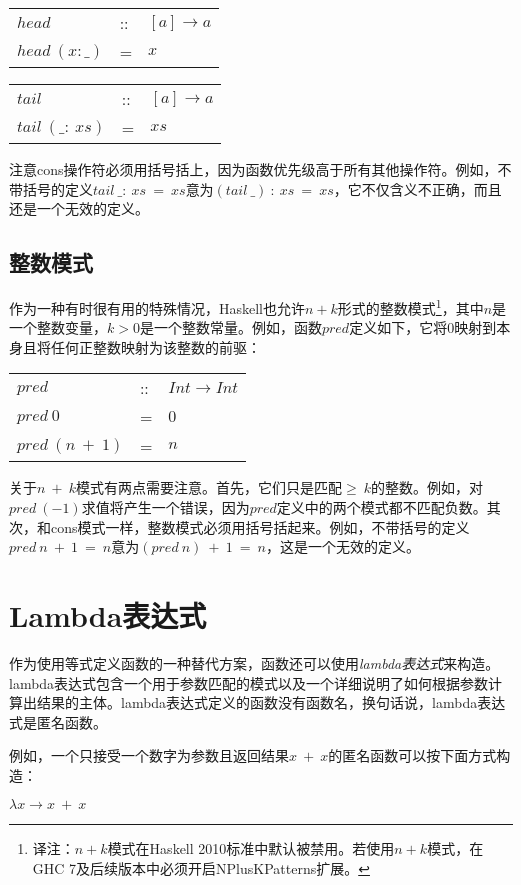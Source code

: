 \begin{tabular}[t]{lll}
$head$&::&$[a] \rightarrow a$\\
$head~(x:\_)$&=&$x$\\
\end{tabular}

\begin{tabular}[t]{lll}
$tail$&::&$[a] \rightarrow a$\\
$tail~(\_:~xs)$&=&$xs$\\
\end{tabular}

注意cons操作符必须用括号括上，因为函数优先级高于所有其他操作符。例如，不带括号的定义$tail~\_:~xs~=~xs$意为$(tail~\_)~:~xs~=~xs$，它不仅含义不正确，而且还是一个无效的定义。

\subsection*{整数模式}
作为一种有时很有用的特殊情况，Haskell也允许$n + k$形式的整数模式\footnote{译注：$n+k$模式在Haskell 2010标准中默认被禁用。若使用$n+k$模式，在GHC 7及后续版本中必须开启NPlusKPatterns扩展。}，其中$n$是一个整数变量，$k > 0$是一个整数常量。例如，函数$pred$定义如下，它将0映射到本身且将任何正整数映射为该整数的前驱：

\begin{tabular}[t]{lll}
$pred$&::&$Int \rightarrow Int$\\
$pred~0$&=&$0$\\
$pred~(n~+~1)$&=&$n$\\
\end{tabular}

关于$n~+~k$模式有两点需要注意。首先，它们只是匹配$\geq ~k$的整数。例如，对$pred~(-1)$求值将产生一个错误，因为$pred$定义中的两个模式都不匹配负数。其次，和cons模式一样，整数模式必须用括号括起来。例如，不带括号的定义$pred~n~+~1~=~n$意为$(pred~n)~+~1~=~n$，这是一个无效的定义。

\section{Lambda表达式}
作为使用等式定义函数的一种替代方案，函数还可以使用\textit{lambda表达式}来构造。lambda表达式包含一个用于参数匹配的模式以及一个详细说明了如何根据参数计算出结果的主体。lambda表达式定义的函数没有函数名，换句话说，lambda表达式是匿名函数。

例如，一个只接受一个数字为参数且返回结果$x~+~x$的匿名函数可以按下面方式构造：

\noindent\hspace*{1cm} $\lambda x \rightarrow x~+~x$

